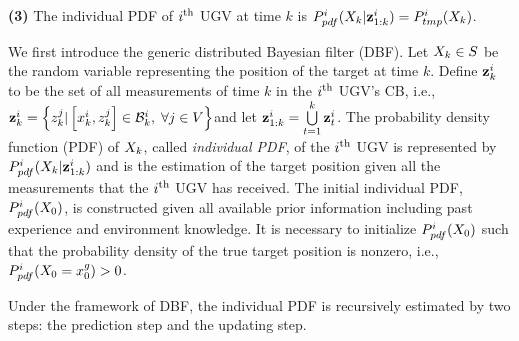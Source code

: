 \begin{algorithm}
\begin{algorithmic}
				\State\textbf{(3)} The individual PDF of $i^\text{th}$ UGV at time $k$ is
				$P^i_{pdf}(X_{k}|\mathbf{z}^{i}_{1:k})=P^i_{tmp}(X_k)$.		
			\end{algorithmic}
		\end{algorithm}

	We first introduce the generic distributed Bayesian filter (DBF).
	Let $X_k\in S$ be the random variable representing the position of the target at time $k$.
	Define $\mathbf{z}^i_k$ to be the set of all measurements of time $k$ in the $i^\text{th}$ UGV's CB, i.e., \small$\mathbf{z}^i_k=\left\lbrace z^j_k| \left[x^i_k,z^j_k\right]\in \mathcal{B}^i_k,\; \forall j\in V\right\rbrace$\normalsize and let $\mathbf{z}^i_{1:k} = \bigcup\limits_{t=1}^k \mathbf{z}^i_t$.
	The probability density function (PDF) of $X_k$, called \textit{individual PDF}, of the $i^\text{th}$ UGV is represented by
	$P^i_{pdf}(X_{k}|\mathbf{z}^i_{1:k})$ and is the estimation of the target position given all the measurements that the $i^\text{th}$ UGV has received.	
	The initial individual PDF, $P^i_{pdf}(X_0)$, is constructed %
	given all available prior information including past experience and environment knowledge. 
	It is necessary to initialize $P^i_{pdf}(X_0)$ such that the probability density of the true target position is nonzero, i.e., $P^i_{pdf}(X_0=x^g_0)> 0$.
	
	Under the framework of DBF, the individual PDF is recursively estimated by two steps: the prediction step and the updating step. 
	
